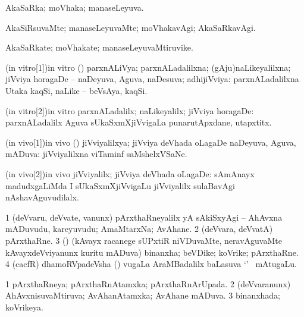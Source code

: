 \bentry
{}
\gl{\gu}
\bmng
AkaSaRka; moVhaka; manaseLeyuva. 
\emng
\eentry

\bentry
{}
\gl{\kirxvi}
\bmng
AkaSiRsuvaMte; manaseLeyuvaMte; moVhakavAgi; AkaSaRkavAgi. 
\emng
\eentry

\bentry
{}
\gl{\nA}
\bmng
AkaSaRkate; moVhakate; manaseLeyuvaMtiruvike. 
\emng
\eentry

\bentry
\wordf(in vitro[1]){in vitro}
\gl{\gu}
\expl{\Latin}
\bmng
(\jiVvi) parxnALiVya; parxnALadalilxna; (gAju)naLikeyalilxna; jiVviya horagaDe -- naDeyuva, Aguva, naDesuva; adhijiVviya:  parxnALadalilxna Utaka kaqSi, naLike -- beVsAya, kaqSi. 
\emng
\eentry

\bentry
\wordf(in vitro[2]){in vitro}
\gl{\kirxvi}
\expl{\Latin }
\bmng
parxnALadalilx; naLikeyalilx; jiVviya horagaDe:  parxnALadalilx Aguva sUkaSxmXjiVvigaLa punarutApxdane, utapxtitx. 
\emng
\eentry

\bentry
\wordf(in vivo[1]){in vivo}
\gl{\gu}
\expl{\Latin}
\bmng
(\jiVvi) jiVviyalilxya; jiVviya deVhada oLagaDe naDeyuva, Aguva, mADuva:  jiVviyalilxna viTaminf  saMshelxVSaNe. 
\emng
\eentry

\bentry
\wordf(in vivo[2]){in vivo}
\gl{\kirxvi}
\expl{\Latin }
\bmng
jiVviyalilx; jiVviya deVhada oLagaDe:  sAmAnayx madudxgaLiMda I sUkaSxmXjiVvigaLu jiVviyalilx sulaBavAgi nAshavAguvudilalx. 
\emng
\eentry

\bentry
{}
\gl{\nA}
\bmng
\bnum
\num{1} (deVvaru, deVvate, \mo vanunx) pArxthaRneyalilx yA sAkiSxyAgi -- AhAvxna mADuvudu, kareyuvudu; AmaMtarxNa; AvAhane. 
\num{2} (deVvara, deVvatA) pArxthaRne. 
\num{3} (\kAparx) (kAvayx racanege sUPxtiR niVDuvaMte, neravAguvaMte kAvayxdeVviyanunx kuritu mADuva) binanxha; beVDike; koVrike; pArxthaRne. 
\num{4} (cacfR) dhamoRVpadeVsha () \mo vugaLa AraMBadalilx baLasuva `' \mo\ mAtugaLu. 
\enum
\emng
\eentry

\bentry
{}
\gl{\gu}
\bmng
\bnum
\num{1} pArxthaRneya; pArxthaRnAtamxka; pArxthaRnArUpada. 
\num{2} (deVvaranunx) AhAvxnisuvaMtiruva; AvAhanAtamxka; AvAhane mADuva. 
\num{3} binanxhada; koVrikeya. 
\enum
\emng
\eentry

